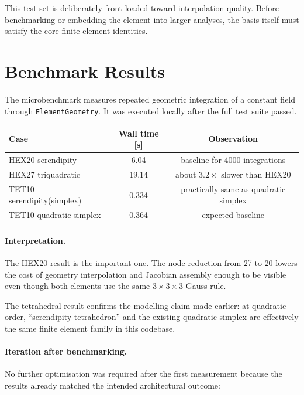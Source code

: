 This test set is deliberately front-loaded toward interpolation quality.
Before benchmarking or embedding the element into larger analyses, the basis
itself must satisfy the core finite element identities.


\section{Benchmark Results}
\label{sec:serendipity_benchmark}

The microbenchmark measures repeated geometric integration of a constant field
through \texttt{ElementGeometry}.  It was executed locally after the full test
suite passed.

\begin{center}
\begin{tabular}{lcc}
  \toprule
  Case & Wall time [s] & Observation \\
  \midrule
  HEX20 serendipity & 6.04 & baseline for 4000 integrations \\
  HEX27 triquadratic & 19.14 & about \(3.2\times\) slower than HEX20 \\
  TET10 serendipity(simplex) & 0.334 & practically same as quadratic simplex \\
  TET10 quadratic simplex & 0.364 & expected baseline \\
  \bottomrule
\end{tabular}
\end{center}

\paragraph{Interpretation.}
The HEX20 result is the important one.  The node reduction from 27 to 20 lowers
the cost of geometry interpolation and Jacobian assembly enough to be visible
even though both elements use the same \(3 \times 3 \times 3\) Gauss rule.

The tetrahedral result confirms the modelling claim made earlier:
at quadratic order, ``serendipity tetrahedron'' and the existing quadratic
simplex are effectively the same finite element family in this codebase.

\paragraph{Iteration after benchmarking.}
No further optimisation was required after the first measurement because the
results already matched the intended architectural outcome:

